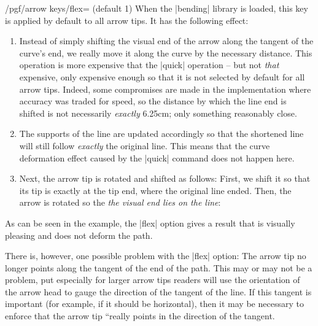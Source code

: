 \begin{key}{/pgf/arrow keys/flex= (default 1)}
  When the |bending| library is loaded, this key is applied by default
  to all arrow tips. It has the following effect:
  \begin{enumerate}
  \item Instead of simply shifting the visual end of the arrow along
    the tangent of the curve's end, we really move it along the curve
    by the necessary distance. This operation is more expensive that
    the |quick| operation -- but not \emph{that} expensive, only
    expensive enough so that it is not selected by default for all
    arrow tips. Indeed, some compromises are made in the
    implementation where accuracy was traded for speed, so the
    distance by which the line end is shifted is not necessarily
    \emph{exactly} 6.25cm; only something reasonably close.
  \item The supports of the line are updated accordingly so that the
    shortened line will still follow \emph{exactly} the original
    line. This means that the curve deformation effect caused by the
    |quick| command does not happen here.
  \item Next, the arrow tip is rotated and shifted as follows: First,
    we shift it so that its tip is exactly at the tip end, where the
    original line ended. Then, the arrow is rotated so the \emph{the
      visual end lies on the line}:
\begin{codeexample}[]
\end{codeexample}
  \end{enumerate}

  As can be seen in the example, the |flex| option gives a result that
  is visually pleasing and does not deform the path.
  
  There is, however, one possible problem with the |flex| option: The
  arrow tip no longer points along the tangent of the end of the
  path. This may or may not be a problem, put especially for larger
  arrow tips readers will use the orientation of the arrow head to
  gauge the direction of the tangent of the line. If this tangent is
  important (for example, if it should be horizontal), then it may be
  necessary to enforce that the arrow tip ``really points in the
  direction of the tangent.


\end{key}
